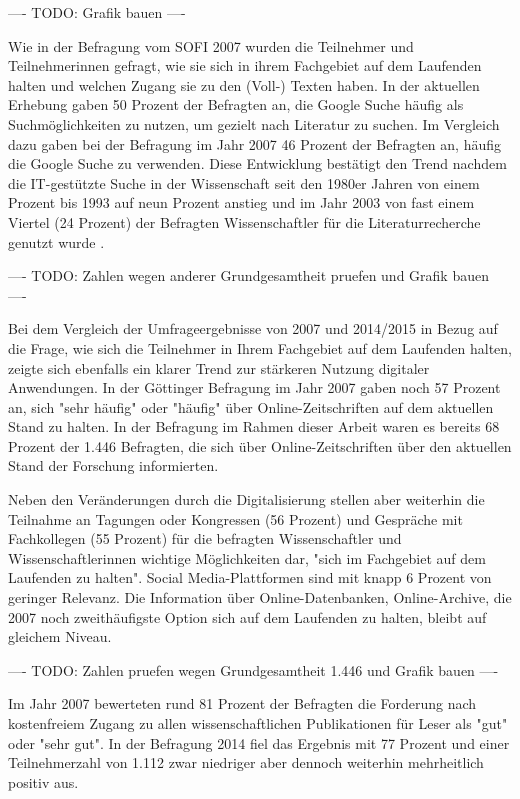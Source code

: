 ---- TODO: Grafik bauen ----

Wie in der Befragung vom SOFI 2007 wurden die Teilnehmer und Teilnehmerinnen gefragt, wie sie sich in ihrem Fachgebiet auf dem Laufenden halten und welchen Zugang sie zu den (Voll-) Texten haben. In der aktuellen Erhebung gaben 50 Prozent der Befragten an, die Google Suche häufig als Suchmöglichkeiten zu nutzen, um gezielt nach Literatur zu suchen. Im Vergleich dazu gaben bei der Befragung im Jahr 2007 46 Prozent der Befragten an, häufig die Google Suche zu verwenden. Diese Entwicklung bestätigt den Trend nachdem die IT-gestützte Suche in der Wissenschaft seit den 1980er Jahren von einem Prozent bis 1993 auf neun Prozent anstieg und im Jahr 2003 von fast einem Viertel (24 Prozent) der Befragten Wissenschaftler für die Literaturrecherche genutzt wurde \cite{hanekop_2008}.

---- TODO: Zahlen wegen anderer Grundgesamtheit pruefen und Grafik bauen ----

Bei dem Vergleich der Umfrageergebnisse von 2007 und 2014/2015 in Bezug auf die Frage, wie sich die Teilnehmer in Ihrem Fachgebiet auf dem Laufenden halten, zeigte sich ebenfalls ein klarer Trend zur stärkeren Nutzung digitaler Anwendungen. In der Göttinger Befragung im Jahr 2007 gaben noch 57 Prozent an, sich "sehr häufig" oder "häufig" über Online-Zeitschriften auf dem aktuellen Stand zu halten. In der Befragung im Rahmen dieser Arbeit waren es bereits 68 Prozent der 1.446 Befragten, die sich über Online-Zeitschriften über den aktuellen Stand der Forschung informierten.

Neben den Veränderungen durch die Digitalisierung stellen aber weiterhin die Teilnahme an Tagungen oder Kongressen (56 Prozent) und Gespräche mit Fachkollegen (55 Prozent) für die befragten Wissenschaftler und Wissenschaftlerinnen wichtige Möglichkeiten dar, "sich im Fachgebiet auf dem Laufenden zu halten". Social Media-Plattformen sind mit knapp 6 Prozent von geringer Relevanz. Die Information über Online-Datenbanken, Online-Archive, die 2007 noch zweithäufigste Option sich auf dem Laufenden zu halten, bleibt auf gleichem Niveau.

---- TODO: Zahlen pruefen wegen Grundgesamtheit 1.446 und Grafik bauen ----

Im Jahr 2007 bewerteten rund 81 Prozent der Befragten die Forderung nach kostenfreiem Zugang zu allen wissenschaftlichen Publikationen für Leser als "gut" oder "sehr gut". In der Befragung 2014 fiel das Ergebnis mit 77 Prozent und einer Teilnehmerzahl von 1.112 zwar niedriger aber dennoch weiterhin mehrheitlich positiv aus.

